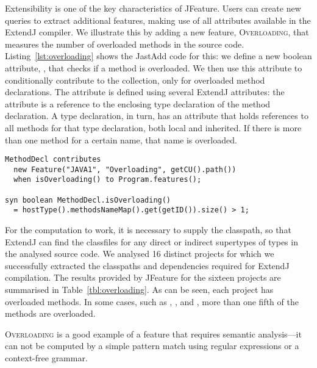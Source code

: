 Extensibility is one of the key characteristics of JFeature. Users can create new queries to extract additional features, making use of all attributes available in the ExtendJ compiler.
We illustrate this by adding a new feature, \textsc{Overloading}, that measures the number of overloaded methods in the source code.
Listing~\ref{lst:overloading} shows the JastAdd code for this: we define a new boolean attribute, , that checks if a method is overloaded. We then use this attribute to conditionally contribute to the  collection, only for overloaded method declarations.
The attribute  is defined using several ExtendJ attributes:
the attribute  is a reference to the enclosing type declaration of the method declaration.
A type declaration, in turn, has an attribute  that holds references to all methods for that type declaration, both local and inherited. If there is more than one method for a certain name, that name is overloaded.

\begin{lstlisting}[language=JastAdd, numbers=none, label=lst:overloading ,caption=Definition of the \textsc{Overloading} feature]
MethodDecl contributes
  new Feature("JAVA1", "Overloading", getCU().path())
  when isOverloading() to Program.features();

syn boolean MethodDecl.isOverloading()
  = hostType().methodsNameMap().get(getID()).size() > 1;
\end{lstlisting}
For the computation to work, it is necessary to supply the classpath, so that ExtendJ can find the classfiles for any direct or indirect supertypes of types in the analysed source code.
We analysed 16 distinct projects for which we  successfully extracted the classpaths and dependencies required for ExtendJ compilation. The results provided by JFeature for the sixteen projects are summarised in Table~\ref{tbl:overloading}. As can be seen, each project has overloaded methods. In some cases, such as , , and , more than one fifth of the methods are overloaded.

\textsc{Overloading} is a good example of a feature that requires semantic analysis---it can not be computed by a simple pattern match using regular expressions or a context-free grammar.

